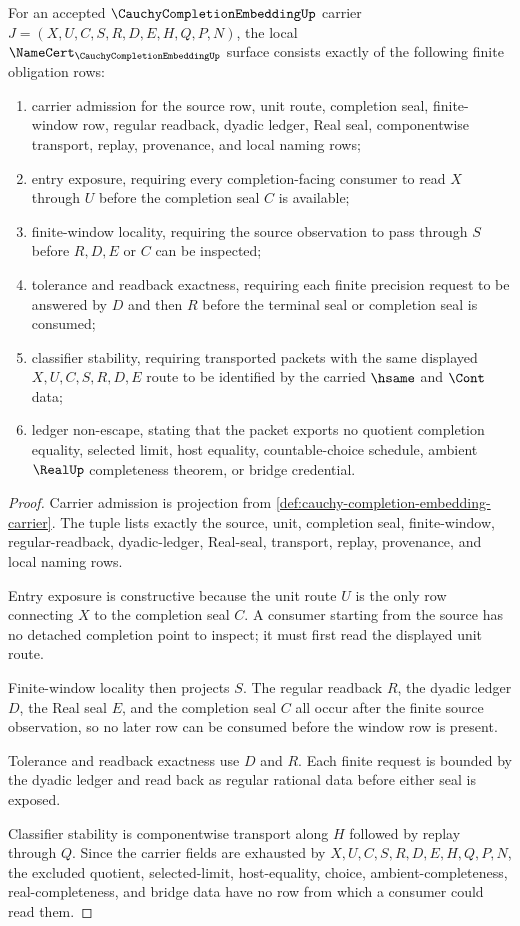 \begin{theorem}
\label{thm:cauchy-completion-embedding-namecert-obligations}
For an accepted $\CauchyCompletionEmbeddingUp$ carrier $J=(X,U,C,S,R,D,E,H,Q,P,N)$, the local $\NameCert_{\CauchyCompletionEmbeddingUp}$ surface consists exactly of the following finite obligation rows:
\begin{enumerate}
\item carrier admission for the source row, unit route, completion seal, finite-window row, regular readback, dyadic ledger, Real seal, componentwise transport, replay, provenance, and local naming rows;
\item entry exposure, requiring every completion-facing consumer to read $X$ through $U$ before the completion seal $C$ is available;
\item finite-window locality, requiring the source observation to pass through $S$ before $R,D,E$ or $C$ can be inspected;
\item tolerance and readback exactness, requiring each finite precision request to be answered by $D$ and then $R$ before the terminal seal or completion seal is consumed;
\item classifier stability, requiring transported packets with the same displayed $X,U,C,S,R,D,E$ route to be identified by the carried $\hsame$ and $\Cont$ data;
\item ledger non-escape, stating that the packet exports no quotient completion equality, selected limit, host equality, countable-choice schedule, ambient $\RealUp$ completeness theorem, or bridge credential.
\end{enumerate}
\end{theorem}
\begin{proof}
Carrier admission is projection from \autoref{def:cauchy-completion-embedding-carrier}. The tuple lists exactly the source, unit, completion seal, finite-window, regular-readback, dyadic-ledger, Real-seal, transport, replay, provenance, and local naming rows.

Entry exposure is constructive because the unit route $U$ is the only row connecting $X$ to the completion seal $C$. A consumer starting from the source has no detached completion point to inspect; it must first read the displayed unit route.

Finite-window locality then projects $S$. The regular readback $R$, the dyadic ledger $D$, the Real seal $E$, and the completion seal $C$ all occur after the finite source observation, so no later row can be consumed before the window row is present.

Tolerance and readback exactness use $D$ and $R$. Each finite request is bounded by the dyadic ledger and read back as regular rational data before either seal is exposed.

Classifier stability is componentwise transport along $H$ followed by replay through $Q$. Since the carrier fields are exhausted by $X,U,C,S,R,D,E,H,Q,P,N$, the excluded quotient, selected-limit, host-equality, choice, ambient-completeness, real-completeness, and bridge data have no row from which a consumer could read them.
\end{proof}

